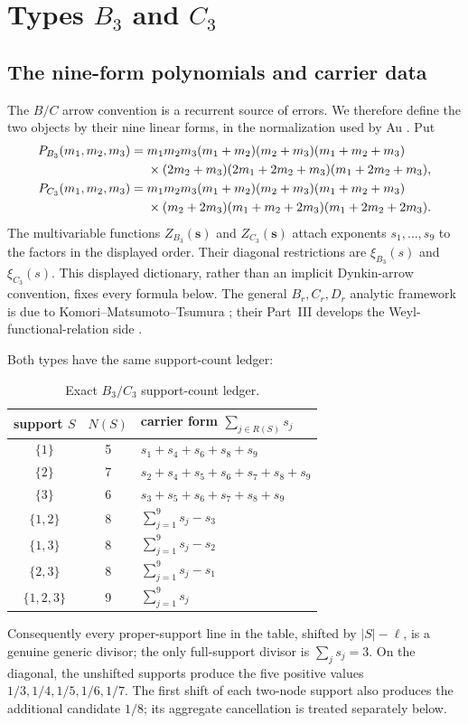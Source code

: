 \documentclass[11pt]{article}
\begin{document}
\section{Types \texorpdfstring{\(B_3\)}{B3} and \texorpdfstring{\(C_3\)}{C3}}
\label{sec:B3C3}

\subsection{The nine-form polynomials and carrier data}

The \(B/C\) arrow convention is a recurrent source of errors.  We
therefore define the two objects by their nine linear forms, in the
normalization used by Au \cite[Section~9]{Au2025}.  Put
\begin{align}
 P_{B_3}(m_1,m_2,m_3)
={}&m_1m_2m_3(m_1+m_2)(m_2+m_3)(m_1+m_2+m_3)\notag\\
 &\times(2m_2+m_3)(2m_1+2m_2+m_3)(m_1+2m_2+m_3),
 \label{eq:B3poly}\\
 P_{C_3}(m_1,m_2,m_3)
={}&m_1m_2m_3(m_1+m_2)(m_2+m_3)(m_1+m_2+m_3)\notag\\
 &\times(m_2+2m_3)(m_1+m_2+2m_3)(m_1+2m_2+2m_3).
 \label{eq:C3poly}
\end{align}
The multivariable functions \(Z_{B_3}(\mathbf s)\) and
\(Z_{C_3}(\mathbf s)\) attach exponents \(s_1,\ldots,s_9\) to the
factors in the displayed order.  Their diagonal restrictions are
\(\xi_{B_3}(s)\) and \(\xi_{C_3}(s)\).  This displayed dictionary,
rather than an implicit Dynkin-arrow convention, fixes every formula
below.  The general \(B_r,C_r,D_r\) analytic framework is due to
Komori--Matsumoto--Tsumura \cite{KMT2010II}; their Part~III develops the
Weyl-functional-relation side \cite{KMT2012III}.

Both types have the same support-count ledger:
\begin{table}[ht]
\centering
\small
\begin{tabular}{@{}ccl@{}}
\toprule
support \(S\) & \(N(S)\) & carrier form \(\sum_{j\in R(S)}s_j\)\\
\midrule
\(\{1\}\)&5&\(s_1+s_4+s_6+s_8+s_9\)\\
\(\{2\}\)&7&\(s_2+s_4+s_5+s_6+s_7+s_8+s_9\)\\
\(\{3\}\)&6&\(s_3+s_5+s_6+s_7+s_8+s_9\)\\
\(\{1,2\}\)&8&\(\sum_{j=1}^9s_j-s_3\)\\
\(\{1,3\}\)&8&\(\sum_{j=1}^9s_j-s_2\)\\
\(\{2,3\}\)&8&\(\sum_{j=1}^9s_j-s_1\)\\
\(\{1,2,3\}\)&9&\(\sum_{j=1}^9s_j\)\\
\bottomrule
\end{tabular}
\caption{Exact \(B_3/C_3\) support-count ledger.}
\label{tab:B3C3-carrier}
\end{table}
Consequently every proper-support line in the table, shifted by
\(|S|-\ell\), is a genuine generic divisor; the only full-support
divisor is \(\sum_js_j=3\).  On the diagonal, the unshifted supports
produce the five positive values
\(1/3,1/4,1/5,1/6,1/7\).  The first shift of each two-node support also
produces the additional candidate \(1/8\); its aggregate cancellation is treated
separately below.
\end{document}
